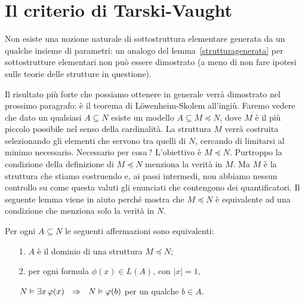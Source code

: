 \section{Il criterio di Tarski-Vaught}

Non esiste una nozione naturale di sottostruttura elementare generata da un qualche insieme di parametri: un analogo del lemma~\ref{strutturagenerata} per sottostrutture elementari non pu\`o essere dimostrato (a meno di non fare ipotesi sulle teorie delle strutture in questione).

Il risultato pi\`u forte che possiamo ottenere in generale verr\`a dimostrato nel prossimo paragrafo: \`e il teorema di L\"owenheim-Skolem all'ingi\`u. Faremo vedere che dato un qualsiasi $A\subseteq N$ esiste un modello $A\subseteq M\preceq N$, dove $M$ \`e il pi\`u piccolo possibile nel senso della cardinalit\`a. La struttura $M$ verr\`a costruita selezionando gli elementi che servono tra quelli di $N$, cercando di limitarsi al minimo necessario. Necessario per cosa\,? L'obiettivo \`e $M\preceq N$. Purtroppo la condizione della definizione di $M\preceq N$ menziona la verit\`a in $M$. Ma $M$ \`e la struttura che stiamo costruendo e, ai passi intermedi, non abbiamo nessun controllo su come questa valuti gli enunciati che contengono dei quantificatori. Il seguente lemma viene in aiuto perch\'e mostra che $M\preceq N$ \`e equivalente ad una condizione che menziona solo la verit\`a in $N$.

\begin{lemma}\label{TarskiVaught}%
Per ogni $A\subseteq N$ le seguenti affermazioni sono equivalenti:
\begin{itemize}
\item[1.] $A$ \`e il dominio di una struttura $M\preceq N$;
\item[2.] per ogni formula $\phi(x)\in L(A)$, con $|x|=1$,\smallskip

$N\models\E x\,\phi(x)\ \ \IMP\ \ N\models\phi(b)$ per un qualche $b\in A$.
\end{itemize}
\end{lemma}

\def\ceq#1#2#3{%
\parbox{20ex}{$\displaystyle #1$}%
\parbox{5ex}{\hfil$#2$}%
\parbox{15ex}{$\displaystyle #3$}}

